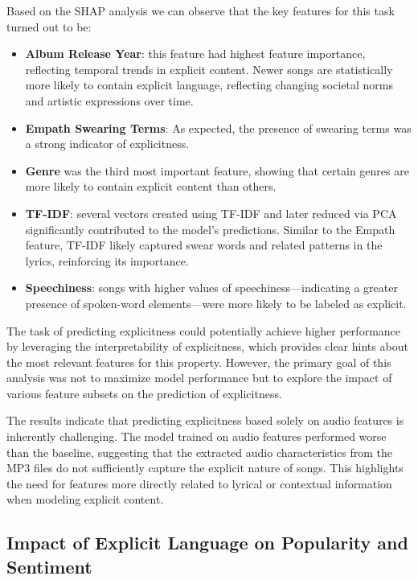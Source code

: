 Based on the SHAP analysis we can observe that the key features for this task
turned out to be:
\begin{itemize}
  \item \textbf{Album Release Year}: this feature had  highest feature
    importance, reflecting temporal trends in explicit content. Newer songs are
    statistically more likely to contain explicit language, reflecting changing
    societal norms and artistic expressions over time.
  \item \textbf{Empath Swearing Terms}: As expected, the presence of swearing
    terms was a strong indicator of explicitness.
  \item \textbf{Genre} was the third most important feature, showing that
    certain genres  are more likely to contain explicit content than others.
  \item \textbf{TF-IDF}: several vectors created using TF-IDF and later reduced
    via PCA significantly contributed to the model's predictions. Similar to
    the Empath feature, TF-IDF likely captured swear words and related patterns
    in the lyrics, reinforcing its importance.
  \item \textbf{Speechiness}: songs with higher values of
    speechiness—indicating a greater presence of spoken-word elements—were more
    likely to be labeled as explicit.
\end{itemize}




The task of predicting explicitness could potentially achieve higher
performance by leveraging the interpretability of explicitness, which provides
clear hints about the most relevant features for this property. However, the
primary goal of this analysis was not to maximize model performance but to
explore the impact of various feature subsets on the prediction of
explicitness.

The results indicate that predicting explicitness based solely on audio
features is inherently challenging. The model trained on audio features
performed worse than the baseline, suggesting that the extracted audio
characteristics from the MP3 files do not sufficiently capture the explicit
nature of songs. This highlights the need for features more directly related to
lyrical or contextual information when modeling explicit content.



\subsection{Impact of Explicit Language on Popularity and Sentiment}
\label{sec:explicitmorepopular}

